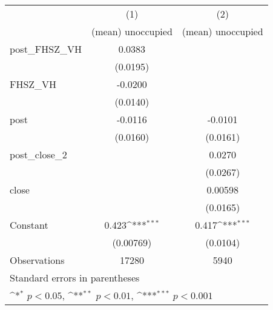 {
\def\sym#1{\ifmmode^{#1}\else\(^{#1}\)\fi}
\begin{tabular}{l*{2}{c}}
\hline\hline
                    &\multicolumn{1}{c}{(1)}&\multicolumn{1}{c}{(2)}\\
                    &\multicolumn{1}{c}{(mean) unoccupied}&\multicolumn{1}{c}{(mean) unoccupied}\\
\hline
post\_FHSZ\_VH        &      0.0383         &                     \\
                    &    (0.0195)         &                     \\
[1em]
FHSZ\_VH             &     -0.0200         &                     \\
                    &    (0.0140)         &                     \\
[1em]
post                &     -0.0116         &     -0.0101         \\
                    &    (0.0160)         &    (0.0161)         \\
[1em]
post\_close\_2        &                     &      0.0270         \\
                    &                     &    (0.0267)         \\
[1em]
close               &                     &     0.00598         \\
                    &                     &    (0.0165)         \\
[1em]
Constant            &       0.423\sym{***}&       0.417\sym{***}\\
                    &   (0.00769)         &    (0.0104)         \\
\hline
Observations        &       17280         &        5940         \\
\hline\hline
\multicolumn{3}{l}{\footnotesize Standard errors in parentheses}\\
\multicolumn{3}{l}{\footnotesize \sym{*} \(p<0.05\), \sym{**} \(p<0.01\), \sym{***} \(p<0.001\)}\\
\end{tabular}
}

